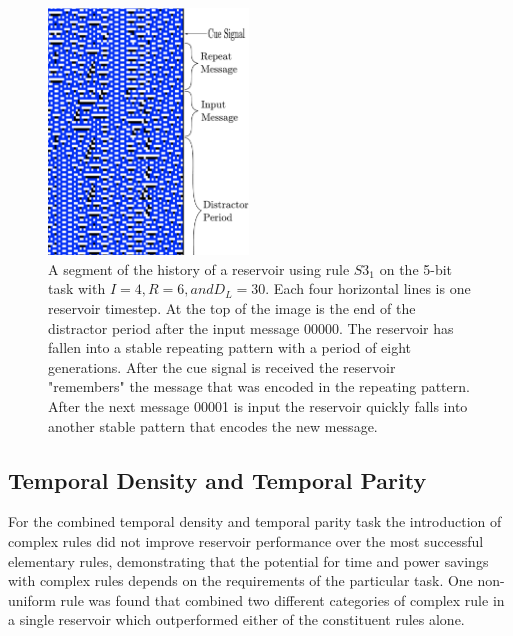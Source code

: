\documentclass{elsarticle}
\begin{document}
\begin{multicols}{2}
\begin{figure}[H]
\centering
\includegraphics[width=0.475\textwidth]{RepeatMessage.pdf}
\caption{A segment of the history of a reservoir using rule $S3_{1}$ on the 
   5-bit task with $I=4, R=6, and D_{L}=30$. Each four horizontal lines is one 
      reservoir timestep. At the top of the image is the end of the distractor 
      period after the input message 00000. The reservoir has fallen into a 
      stable repeating pattern with a period of eight generations. After the 
      cue signal is received the reservoir "remembers" the message that was 
      encoded in the repeating pattern. After the next message 00001 is input 
      the reservoir quickly falls into another stable pattern that encodes the 
      new message.} 
        
\label{repeat}
\end{figure}

\subsection{Temporal Density and Temporal Parity}
For the combined temporal density and temporal parity task the introduction of 
complex rules did not improve reservoir performance over the most successful 
elementary rules, demonstrating that the potential for time and power savings 
with complex rules depends on the requirements of the particular task. One 
non-uniform rule was found that combined two different categories of complex 
rule in a single reservoir which outperformed either of the constituent rules 
alone.




\iffalse


\end{multicols}
\end{document}
